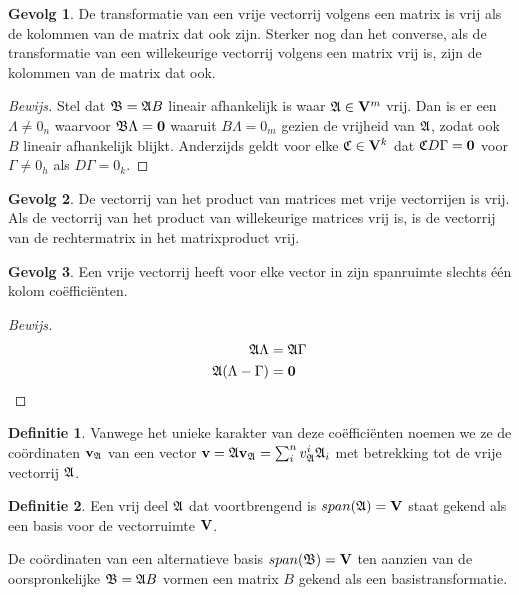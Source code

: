 \documentclass{amsart}
\theoremstyle{definition}
\newtheorem{dfn}{Definitie}[section]
\newtheorem{csq}{Gevolg}[section]
\newenvironment{bewijs}{\begin{proof}[Bewijs]}{\end{proof}}
\newcommand{\vecspace}[1][v]{\mathrm{\mathbf{\MakeUppercase#1}}}
\newcommand{\vecspacen}[1][n]{\vecspace^#1}
\newcommand{\vvec}[1][v]{\mathbf{#1}}
\newcommand{\zerovec}{\vvec[0]}
\newcommand{\vecrow}[1][a]{\mathfrak{\MakeUppercase{#1}}}
\newcommand{\rvec}[2][i]{{#2}_{#1}}
\newcommand{\rvecr}[2][i]{\rvec[#1]{\vecrow[#2]}}
\newcommand{\rveci}[1][i]{\rvecr[#1]{a}}
\newcommand{\cvec}[2]{{#1}_{#2}}
\newcommand{\cvecv}[2][v]{\cvec{\vvec[#1]}{#2}}
\newcommand{\cvecva}[1][a]{\cvecv{\vecrow[#1]}}
\newcommand{\vcord}[3]{{#1}^{#2}_{#3}}
\newcommand{\vcordv}[3][v]{\vcord{#1}{#2}{\vecrow[#3]}}
\newcommand{\vcordvi}[2][i]{\vcordv{#1}{#2}}
\newcommand{\vcordvia}[1][i]{\vcordvi[#1]{a}}
\begin{document}
\begin{csq}
    De transformatie van een vrije vectorrij volgens een matrix is vrij als de kolommen van de matrix dat ook zijn. Sterker nog dan het converse, als de transformatie van een willekeurige vectorrij volgens een matrix vrij is, zijn de kolommen van de matrix dat ook.
    \begin{bewijs}
        Stel dat $\vecrow[b] = \vecrow B$ lineair afhankelijk is waar $\vecrow \in \vecspacen[m]$ vrij.
        Dan is er een $\Lambda \neq 0_n$ waarvoor $\vecrow[b] \Lambda = \zerovec$ waaruit $B \Lambda = 0_m$ gezien de vrijheid van $\vecrow$, zodat ook $B$ lineair afhankelijk blijkt.
        Anderzijds geldt voor elke $\vecrow[c] \in \vecspacen[k]$ dat $\vecrow[c] D\Gamma = \zerovec$ voor $\Gamma \neq 0_h$ als $D\Gamma = 0_k$.
    \end{bewijs}
\end{csq}

\begin{csq}
    De vectorrij van het product van matrices met vrije vectorrijen is vrij. Als de vectorrij van het product van willekeurige matrices vrij is, is de vectorrij van de rechtermatrix in het matrixproduct vrij.
\end{csq}

\begin{csq}
    Een vrije vectorrij heeft voor elke vector in zijn spanruimte slechts één kolom coëfficiënten.
    \begin{bewijs}
        \begin{align*}
            \vecrow \Lambda              & = \vecrow \Gamma \\
            \vecrow (\Lambda - \Gamma) & = \zerovec
        \end{align*}
    \end{bewijs}
\end{csq}

\begin{dfn}
    Vanwege het unieke karakter van deze coëfficiënten noemen we ze de coördinaten $\cvecva$ van een vector $\vvec = \vecrow \cvecva = \sum_{i}^{n} \vcordvia \rveci$ met betrekking tot de vrije vectorrij $\vecrow$.
\end{dfn}

\begin{dfn}
    Een vrij deel $\vecrow$ dat voortbrengend is $span(\vecrow) = \vecspace$ staat gekend als een basis voor de vectorruimte $\vecspace$.

    De coördinaten van een alternatieve basis $span(\vecrow[b]) = \vecspace$ ten aanzien van de oorspronkelijke $\vecrow[b] = \vecrow B$ vormen een matrix $B$ gekend als een basistransformatie.
\end{dfn}
\end{document}
